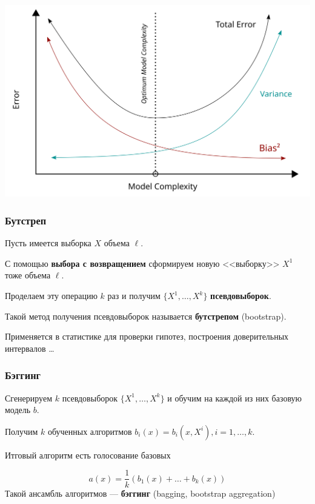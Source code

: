 \documentclass{beamer}
\begin{document}
	\begin{frame}
		\includegraphics[width=1\textwidth]{img/bias_variance_tradeoff.png}	
	\end{frame}

	\begin{frame}
		\frametitle{Бутстреп}

		Пусть имеется выборка $X$ объема $\ell$.

		\vspace{15pt}

		С помощью \textbf{выбора с возвращением} сформируем новую <<выборку>> $X^1$ тоже объема $\ell$. 

		Проделаем эту операцию $k$ раз и получим $\{X^1, \dots, X^k\}$ \textbf{псевдовыборок}.

		\vspace{15pt}

		Такой метод получения псевдовыборок называется \textbf{бутстрепом} (bootstrap).

		\vspace{15pt}

		Применяется в статистике для проверки гипотез, построения доверительных интервалов \dots
	\end{frame}

	\begin{frame}
		\frametitle{Бэггинг}
		
		Сгенерируем $k$ псевдовыборок $\{X^1, \dots, X^k\}$ и обучим на каждой из них базовую модель $b$.
		
		Получим $k$ обученных алгоритмов $b_i(x) = b_i(x, X^i), i=1, \dots, k$.

		Итговый алгоритм есть голосование базовых

		\[
		a(x) = \frac{1}{k} \left( b_1(x) + \dots + b_k(x) \right)
		\]
		Такой ансамбль алгоритмов --- \textbf{бэггинг} (bagging, bootstrap aggregation)	
	\end{frame}
	
\end{document}
